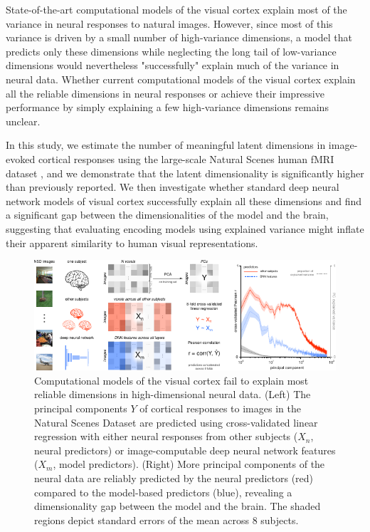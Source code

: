 \documentclass[10pt,letterpaper]{article}
\begin{document}
State-of-the-art computational models of the visual cortex explain most of the variance in neural responses to natural images. However, since most of this variance is driven by a small number of high-variance dimensions, a model that predicts only these dimensions while neglecting the long tail of low-variance dimensions would nevertheless "successfully" explain much of the variance in neural data. Whether current computational models of the visual cortex explain all the reliable dimensions in neural responses or achieve their impressive performance by simply explaining a few high-variance dimensions remains unclear.

In this study, we estimate the number of meaningful latent dimensions in image-evoked cortical responses using the large-scale Natural Scenes human fMRI dataset \cite{Allen2021}, and we demonstrate that the latent dimensionality is significantly higher than previously reported. We then investigate whether standard deep neural network models of visual cortex successfully explain all these dimensions and find a significant gap between the dimensionalities of the model and the brain, suggesting that evaluating encoding models using explained variance might inflate their apparent similarity to human visual representations.

\begin{figure}[ht]
    \centering
    \includegraphics[width=1\textwidth]{ccn}
    \caption[width=1\textwidth]{Computational models of the visual cortex fail to explain most reliable dimensions in high-dimensional neural data. (Left) The principal components $Y$ of cortical responses to images in the Natural Scenes Dataset are predicted using cross-validated linear regression with either neural responses from other subjects ($X_n$, neural predictors) or image-computable deep neural network features ($X_m$, model predictors). (Right) More principal components of the neural data are reliably predicted by the neural predictors (red) compared to the model-based predictors (blue), revealing a dimensionality gap between the model and the brain. The shaded regions depict standard errors of the mean across 8 subjects.}
    \label{figure-0}
\end{figure}
\end{document}
